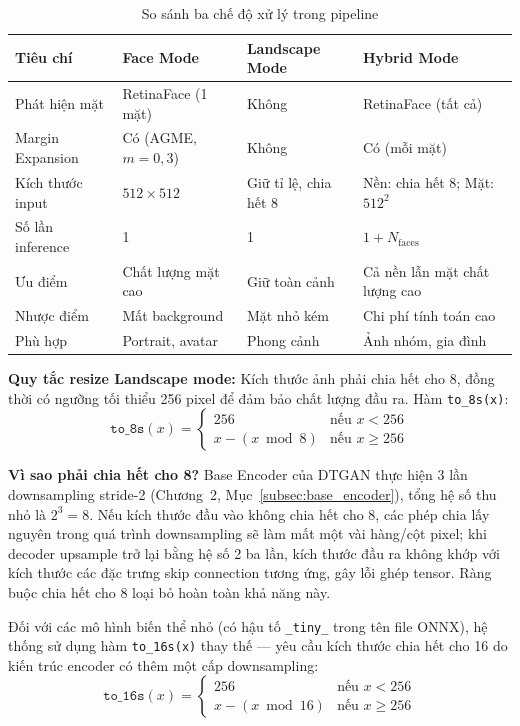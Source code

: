 \begin{table}[H]
\caption{So sánh ba chế độ xử lý trong pipeline}
\label{tab:face_vs_landscape}
\centering
\begin{tabular}{|p{2.4cm}|p{3.8cm}|p{3.8cm}|p{3.8cm}|}
\hline
\textbf{Tiêu chí} & \textbf{Face Mode} & \textbf{Landscape Mode} & \textbf{Hybrid Mode} \\
\hline
Phát hiện mặt & RetinaFace (1 mặt) & Không & RetinaFace (tất cả) \\
\hline
Margin Expansion & Có (AGME, $m=0{,}3$) & Không & Có (mỗi mặt) \\
\hline
Kích thước input & $512 \times 512$ & Giữ tỉ lệ, chia hết 8 & Nền: chia hết 8; Mặt: $512^2$ \\
\hline
Số lần inference & 1 & 1 & $1 + N_{\text{faces}}$ \\
\hline
Ưu điểm & Chất lượng mặt cao & Giữ toàn cảnh & Cả nền lẫn mặt chất lượng cao \\
\hline
Nhược điểm & Mất background & Mặt nhỏ kém & Chi phí tính toán cao \\
\hline
Phù hợp & Portrait, avatar & Phong cảnh & Ảnh nhóm, gia đình \\
\hline
\end{tabular}
\end{table}

\textbf{Quy tắc resize Landscape mode:} Kích thước ảnh phải chia hết cho 8, đồng thời có ngưỡng tối thiểu 256 pixel để đảm bảo chất lượng đầu ra. Hàm \texttt{to\_8s(x)}:
\begin{equation}
\label{eq:to8s}
\texttt{to\_8s}(x) = \begin{cases} 256 & \text{nếu } x < 256 \\ x - (x \bmod 8) & \text{nếu } x \geq 256 \end{cases}
\end{equation}

\textbf{Vì sao phải chia hết cho 8?} Base Encoder của DTGAN thực hiện 3 lần downsampling stride-2 (Chương~2, Mục~\ref{subsec:base_encoder}), tổng hệ số thu nhỏ là $2^3 = 8$. Nếu kích thước đầu vào không chia hết cho 8, các phép chia lấy nguyên trong quá trình downsampling sẽ làm mất một vài hàng/cột pixel; khi decoder upsample trở lại bằng hệ số 2 ba lần, kích thước đầu ra không khớp với kích thước các đặc trưng skip connection tương ứng, gây lỗi ghép tensor. Ràng buộc chia hết cho 8 loại bỏ hoàn toàn khả năng này.

Đối với các mô hình biến thể nhỏ (có hậu tố \texttt{\_tiny\_} trong tên file ONNX), hệ thống sử dụng hàm \texttt{to\_16s(x)} thay thế --- yêu cầu kích thước chia hết cho 16 do kiến trúc encoder có thêm một cấp downsampling:
\begin{equation}
\label{eq:to16s}
\texttt{to\_16s}(x) = \begin{cases} 256 & \text{nếu } x < 256 \\ x - (x \bmod 16) & \text{nếu } x \geq 256 \end{cases}
\end{equation}

